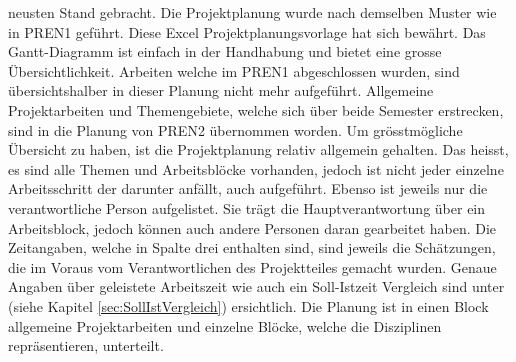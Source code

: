 neusten Stand gebracht. 
\newline
\newline
Die Projektplanung wurde nach demselben Muster wie in PREN1 geführt. Diese Excel 
Projektplanungsvorlage hat sich bewährt. Das Gantt-Diagramm ist einfach in der 
Handhabung und bietet eine grosse Übersichtlichkeit. Arbeiten welche im PREN1 
abgeschlossen wurden, sind übersichtshalber in dieser Planung nicht mehr 
aufgeführt. Allgemeine Projektarbeiten und Themengebiete, welche sich über beide 
Semester erstrecken, sind in die Planung von PREN2 übernommen worden. Um 
grösstmögliche Übersicht zu haben, ist die Projektplanung relativ allgemein 
gehalten. Das heisst, es sind alle Themen und Arbeitsblöcke vorhanden, jedoch 
ist nicht jeder einzelne Arbeitsschritt der darunter anfällt, auch aufgeführt. 
\newline
Ebenso ist jeweils nur die verantwortliche Person aufgelistet. Sie trägt die 
Hauptverantwortung über ein Arbeitsblock, jedoch können auch andere Personen 
daran gearbeitet haben. Die Zeitangaben, welche in Spalte drei enthalten sind, 
sind jeweils die Schätzungen, die im Voraus vom Verantwortlichen des Projektteiles 
gemacht wurden. Genaue Angaben über geleistete Arbeitszeit wie auch ein 
Soll-Istzeit Vergleich sind unter (siehe Kapitel \ref{sec:SollIstVergleich}) ersichtlich. 
\newline
Die Planung ist in einen Block allgemeine Projektarbeiten und einzelne Blöcke, welche die 
Disziplinen repräsentieren, unterteilt.
